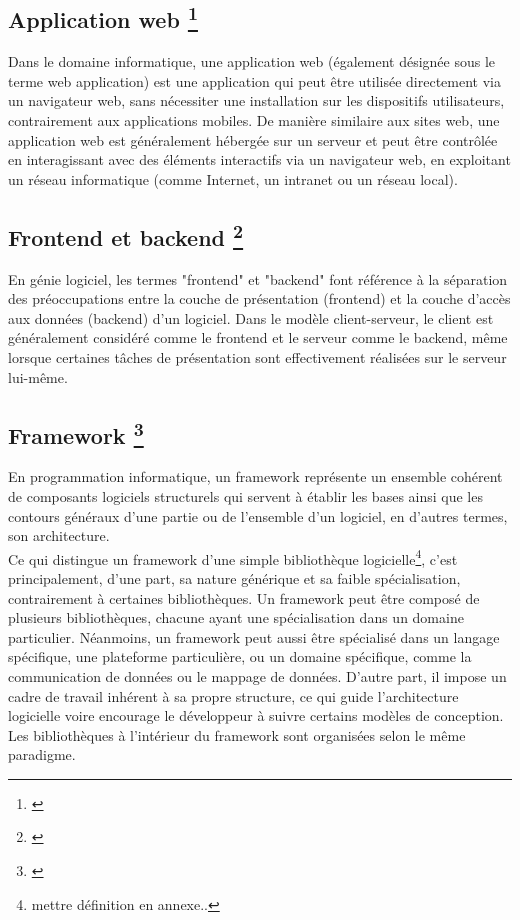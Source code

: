 \documentclass[a4paper, 12pt, french]{article}
\begin{document}
		\subsection{Application web \footnote{\cite{wikipediaApplicationWeb}}}%
			Dans le domaine informatique, une application web (également désignée sous le terme web application) est une application qui peut être utilisée directement via un navigateur web, sans nécessiter une installation sur les dispositifs utilisateurs, contrairement aux applications mobiles. De manière similaire aux sites web, une application web est généralement hébergée sur un serveur et peut être contrôlée en interagissant avec des éléments interactifs via un navigateur web, en exploitant un réseau informatique (comme Internet, un intranet ou un réseau local).
				

		\subsection{Frontend et backend \footnote{\cite{wikipediaFrontendAndBackend}}}%
			En génie logiciel, les termes "frontend" et "backend" font référence à la séparation des préoccupations entre la couche de présentation (frontend) et la couche d'accès aux données (backend) d'un logiciel. Dans le modèle client-serveur, le client est généralement considéré comme le frontend et le serveur comme le backend, même lorsque certaines tâches de présentation sont effectivement réalisées sur le serveur lui-même.			
			
		\subsection{Framework \footnote{\cite{wikipediaFramework}}}%
			En programmation informatique, un framework représente un ensemble cohérent de composants logiciels structurels qui servent à établir les bases ainsi que les contours généraux d'une partie ou de l'ensemble d'un logiciel, en d'autres termes, son architecture.\\

			Ce qui distingue un framework d'une simple bibliothèque logicielle\footnote{mettre définition en annexe..}, c'est principalement, d'une part, sa nature générique et sa faible spécialisation, contrairement à certaines bibliothèques. Un framework peut être composé de plusieurs bibliothèques, chacune ayant une spécialisation dans un domaine particulier. Néanmoins, un framework peut aussi être spécialisé dans un langage spécifique, une plateforme particulière, ou un domaine spécifique, comme la communication de données ou le mappage de données. D'autre part, il impose un cadre de travail inhérent à sa propre structure, ce qui guide l'architecture logicielle voire encourage le développeur à suivre certains modèles de conception. Les bibliothèques à l'intérieur du framework sont organisées selon le même paradigme.\\
\end{document}
